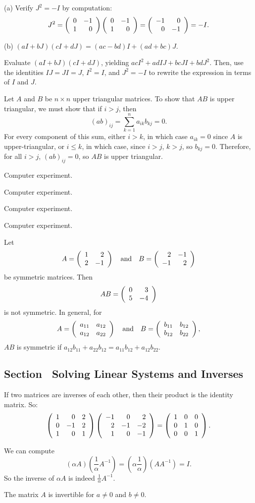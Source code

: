 (a) Verify $J^2 = -I$ by computation:
\[ J^2 = \left(\begin{array}{rr} 0 & -1\\ 1 &0\end{array}\right)\left(\begin{array}{rr} 0 & -1\\ 1 &0\end{array}\right) =
\left(\begin{array}{rr} -1 & 0\\ 0 &-1\end{array}\right) = -I. \]

(b) \ans $(aI + bJ)(cI + dJ) = (ac - bd)I + (ad + bc)J$.

\soln Evaluate $(aI + bJ)(cI + dJ)$, yielding
$acI^2 + adIJ + bcJI + bdJ^2$.  Then, use the identities $IJ = JI = J$,
$I^2 = I$, and $J^2 = -I$ to rewrite the expression in terms of $I$
and $J$.

Let $A$ and $B$ be $n \times n$ upper triangular matrices.  To show
that $AB$ is upper triangular, we must show that if $i > j$, then
\[ (ab)_{ij} = \sum_{k = 1}^{n} a_{ik}b_{kj} = 0. \]
For every component of this sum, either $i > k$, in which case $a_{ik}
= 0$ since $A$ is upper-triangular, or $i \leq k$, in which case, since
$i > j$, $k > j$, so $b_{kj} = 0$.  Therefore, for all $i > j$,
$(ab)_{ij} = 0$, so $AB$ is upper triangular.


 Computer experiment.


 Computer experiment.

 Computer experiment.

 Computer experiment.

 Let
\[ A = \left(\begin{array}{rr} 1 & 2\\ 2 &-1\end{array}\right) \quad\mbox{and}\quad B = \left(\begin{array}{rr} 2 & -1\\ -1 &2\end{array}\right) \]
be symmetric matrices.  Then
\[ AB = \left(\begin{array}{rr} 0 & 3\\ 5 &-4\end{array}\right) \]
is not symmetric.  In general, for
\[ A = \left(\begin{array}{rr} a_{11} & a_{12}\\ a_{12} &a_{22}\end{array}\right) \quad\mbox{and}\quad
B = \left(\begin{array}{rr} b_{11} & b_{12}\\ b_{12} &b_{22}\end{array}\right), \]
$AB$ is symmetric if $a_{12}b_{11} + a_{22}b_{12} = a_{11}b_{12}
+ a_{12}b_{22}$.


\subsection*{Section~\protect{\ref{S:SLS}} Solving Linear Systems and Inverses}

If two matrices are inverses of each other, then their product is the
identity matrix.  So:
\[ \left(\begin{array}{rrr} 1 & 0 & 2 \\ 0 & -1 & 2 \\ 1 & 0 & 1\end{array}\right)
\left(\begin{array}{rrr} -1 & 0 & 2 \\ 2 & -1 & -2 \\ 1 & 0 & -1\end{array}\right) =
\left(\begin{array}{rrr} 1 & 0 & 0 \\ 0 & 1 & 0 \\ 0 & 0 & 1\end{array}\right). \]

We can compute
\[ (\alpha A)\left(\frac{1}{\alpha}A^{-1}\right) =
\left(\alpha\frac{1}{\alpha}\right)(AA^{-1}) = I. \]
So the inverse of $\alpha A$ is indeed $\frac{1}{\alpha}A^{-1}$.

\ans The matrix $A$ is invertible for $a \neq 0$ and $b \neq 0$.

